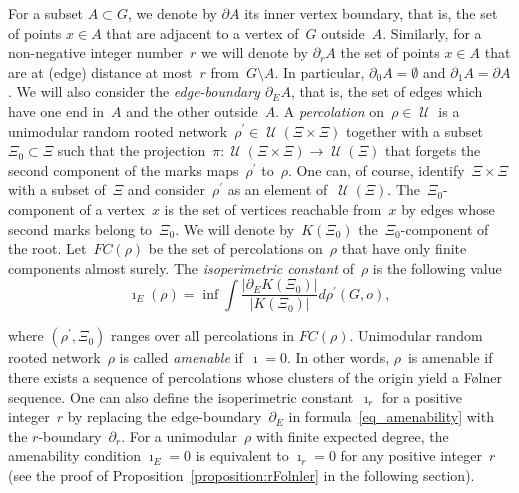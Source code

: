 \documentclass[10pt,a4paper]{amsart}
\DeclareMathOperator{\U}{{\mathcal{U}}}
\begin{document}
For a subset $A\subset G $, we denote by $\partial A$ its inner vertex boundary, that is, the set of points $x \in A$ that are adjacent to a vertex of~$G$ outside~$A$. Similarly, for a non-negative integer number~$r$ we will denote by $\partial_r A$ the set of points $x \in A$ that are at (edge) distance at most~$r$ from~$G \setminus A$. In particular, $\partial_0 A = \emptyset$ and $\partial_1 A = \partial A$. We will also consider the \emph{edge-boundary $\partial_E A$}, that is, the set of edges which have one end in~$A$ and the other outside~$A$. 
A \emph{percolation} on~$\rho \in \U$ is a unimodular random rooted network~$\rho^\prime \in \U(\Xi \times\Xi)$ together with a subset $\Xi_0 \subset\Xi$ such that the projection~$\pi \colon \U(\Xi \times\Xi) \to \U(\Xi)$ that forgets the second component of the marks maps~$\rho^\prime$ to~$\rho$. One can, of course, identify~$\Xi \times\Xi$ with a subset of~$\Xi$ and consider~$\rho^\prime$ as an element of~$\U(\Xi)$.  The~$\Xi_0$-component of a vertex~$x$ is the set of vertices reachable from~$x$ by edges whose second marks belong to~$\Xi_0$. We will denote by~$K(\Xi_0)$ the~$\Xi_0$-component of the root. Let~$FC(\rho)$ be the set of percolations on~$\rho$ that have only finite components almost surely. The \emph{isoperimetric constant} of~$\rho$ is the following value 
\begin{equation}\label{eq_amenability}
\imath_E(\rho) = \inf \int\frac{|\partial_E K(\Xi_0)|}{|K(\Xi_0)|} d \rho^\prime(G,o), 
\end{equation}

where $(\rho^\prime, \Xi_0)$ ranges over all percolations in $FC(\rho)$. Unimodular random rooted network~$\rho$ is called \emph{amenable} if~$\imath = 0$. In other words, $\rho$~is amenable if there exists a sequence of percolations whose clusters of the origin yield a F\o lner sequence.
One can also define the isoperimetric constant~$\imath_r$ for a positive integer~$r$ by replacing the edge-boundary~$\partial_E$ in formula~\eqref{eq_amenability} with the $r$-boundary~$\partial_r$. For a unimodular~$\rho$ with finite expected degree, the amenability condition $\imath_E = 0$ is equivalent to $\imath_r = 0$ for any positive integer~$r$ (see the proof of Proposition~\ref{proposition:rFolnler} in the following section).
\end{document}
